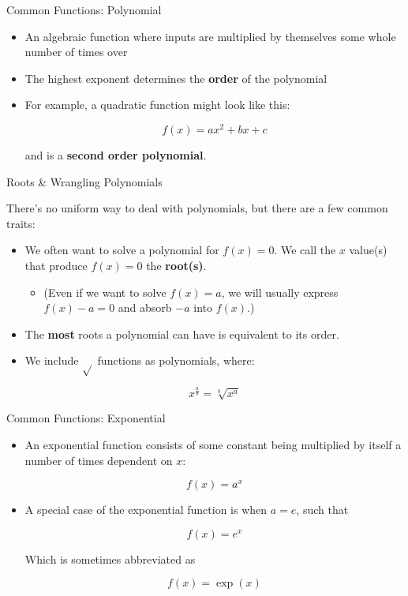 \documentclass[10pt]{beamer}
\begin{document}
\begin{frame}{Common Functions: Polynomial}

\begin{itemize}
    \item An algebraic function where inputs are multiplied by themselves some whole number of times over

    \item The highest exponent determines the \textbf{order} of the polynomial

    \item For example, a quadratic function might look like this:

    \[f(x) = ax^2 + bx + c\]

    and is a \textbf{second order polynomial}.

\end{itemize}

\end{frame}

\begin{frame}{Roots \& Wrangling Polynomials}

There's no uniform way to deal with polynomials, but there are a few common traits:

\begin{itemize}
    \item We often want to solve a polynomial for $f(x) = 0$. We call the $x$ value(s) that produce $f(x) = 0$ the \textbf{root(s)}.
    \begin{itemize}
        \item (Even if we want to solve $f(x) = a$, we will usually express $f(x) - a = 0$ and absorb $-a$ into $f(x)$.)
    \end{itemize} \pause
    \item The \textbf{most} roots a polynomial can have is equivalent to its order.
    \item We include $\sqrt{}$ functions as polynomials, where:

    \[x^\frac{a}{b} = \sqrt[b]{x^a}\]
\end{itemize}

\end{frame}


\begin{frame}{Common Functions: Exponential}

\begin{itemize}
    \item An exponential function consists of some constant being multiplied by itself a number of times dependent on $x$:

    \[f(x) = a^x\]

    \item A special case of the exponential function is when $a = e$, such that

    \[f(x) = e^x\]

    Which is sometimes abbreviated as

    \[f(x) = \exp({x})\]

\end{itemize}

\end{frame}
\end{document}
